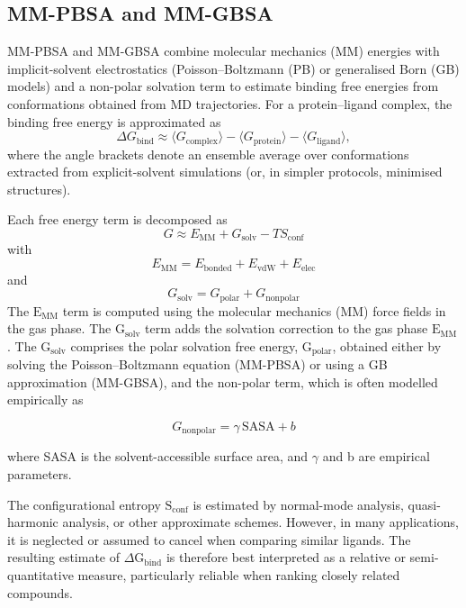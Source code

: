\documentclass[12pt]{article}
\begin{document}
\subsection{MM-PBSA and MM-GBSA}

MM-PBSA and MM-GBSA combine molecular mechanics (MM) energies with implicit-solvent electrostatics (Poisson--Boltzmann (PB) or generalised Born (GB) models) and a non-polar solvation term to estimate binding free energies from conformations obtained from MD trajectories\cite{CH10_kollman1993free,CH10_srinivasan1998mmpbsa,CH10_homeyer2012mmpbsa}. 
For a protein--ligand complex, the binding free energy is approximated as
\begin{equation}
\Delta G_\mathrm{bind} \approx 
\langle G_\mathrm{complex} \rangle 
- \langle G_\mathrm{protein} \rangle 
- \langle G_\mathrm{ligand} \rangle,
\end{equation}
where the angle brackets denote an ensemble average over conformations extracted from explicit-solvent simulations (or, in simpler protocols, minimised structures). 

Each free energy term is decomposed as
\begin{equation}
G \approx E_\mathrm{MM} + G_\mathrm{solv} - TS_\mathrm{conf}
\end{equation}
with
\begin{equation}
E_\mathrm{MM} = E_\mathrm{bonded} + E_\mathrm{vdW} + E_\mathrm{elec}
\end{equation}
and
\begin{equation}
G_\mathrm{solv} = G_\mathrm{polar} + G_\mathrm{nonpolar} 
\end{equation}
The $\textrm{E}_\textrm{MM}$ term is computed using the molecular mechanics (MM) force fields in the gas phase. The  $\textrm{G}_\textrm{solv}$ term adds the solvation correction to the gas phase $\textrm{E}_\textrm{MM}$. The $\textrm{G}_\textrm{solv}$ comprises the polar solvation free energy, $\textrm{G}_\textrm{polar}$, obtained either by solving the Poisson--Boltzmann equation (MM-PBSA) or using a GB approximation (MM-GBSA), and the non-polar term, which is often modelled empirically as

\begin{equation}
G_\mathrm{nonpolar} = \gamma\, \mathrm{SASA} + b
\end{equation}

where SASA is the solvent-accessible surface area, and $\gamma$ and b are empirical parameters. 

The configurational entropy $\textrm{S}_\textrm{conf}$ is estimated by normal-mode analysis, quasi-harmonic analysis, or other approximate schemes. However, in many applications, it is neglected or assumed to cancel when comparing similar ligands. The resulting estimate of $\Delta \textrm{G}_\textrm{bind}$ is therefore best interpreted as a relative or semi-quantitative measure, particularly reliable when ranking closely related compounds\cite{CH10_homeyer2012mmpbsa}. 
\end{document}
